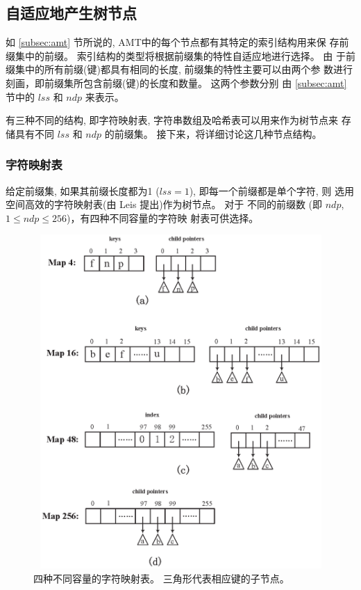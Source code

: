 \subsection{自适应地产生树节点}
\label{subsec:nodes}

如 \ref{subsec:amt} 节所说的, AMT中的每个节点都有其特定的索引结构用来保
存前缀集中的前缀。 索引结构的类型将根据前缀集的特性自适应地进行选择。 由
于前缀集中的所有前缀(键)都具有相同的长度, 前缀集的特性主要可以由两个参
数进行刻画，即前缀集所包含前缀(键)的长度和数量。 这两个参数分别
由 \ref{subsec:amt} 节中的 $lss$ 和 $ndp$ 来表示。

有三种不同的结构, 即字符映射表, 字符串数组及哈希表可以用来作为树节点来
存储具有不同 $lss$ 和 $ndp$ 的前缀集。 接下来，将详细讨论这几种节点结构。

\noindent\subsubsection{字符映射表}

给定前缀集, 如果其前缀长度都为1 ($lss=1$), 即每一个前缀都是单个字符, 则
选用空间高效的字符映射表(由 Leis \cite{Leis2013} 提出)作为树节点。 对于
不同的前缀数 (即 $ndp$, $1 \leq ndp \leq 256$)，有四种不同容量的字符映
射表可供选择。

\begin{figure}[H]
  \centering
  \includegraphics[height=5in, width=5in]{figures/2_MPM/Maps}
  \caption{四种不同容量的字符映射表。 三角形代表相应键的子节点。}
  \label{fig:character map}
\end{figure}

